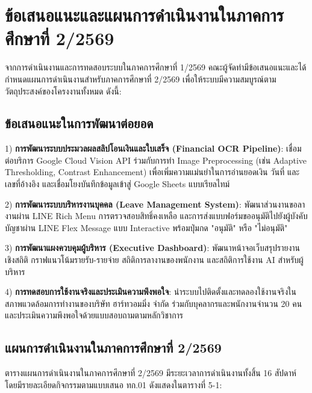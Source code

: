 \section{ข้อเสนอแนะและแผนการดำเนินงานในภาคการศึกษาที่ 2/2569}
\hspace*{1.3em}
จากการดำเนินงานและการทดสอบระบบในภาคการศึกษาที่ 1/2569 คณะผู้จัดทำมีข้อเสนอแนะและได้กำหนดแผนการดำเนินงานสำหรับภาคการศึกษาที่ 2/2569 เพื่อให้ระบบมีความสมบูรณ์ตามวัตถุประสงค์ของโครงงานทั้งหมด ดังนี้:

\subsection{ข้อเสนอแนะในการพัฒนาต่อยอด}
\begin{mycustomitem}
\item 1) \textbf{การพัฒนาระบบประมวลผลสลิปโอนเงินและใบเสร็จ (Financial OCR Pipeline)}: เชื่อมต่อบริการ Google Cloud Vision API ร่วมกับการทำ Image Preprocessing (เช่น Adaptive Thresholding, Contrast Enhancement) เพื่อเพิ่มความแม่นยำในการอ่านยอดเงิน วันที่ และเลขที่อ้างอิง และเชื่อมโยงบันทึกข้อมูลเข้าสู่ Google Sheets แบบเรียลไทม์
\end{mycustomitem}

\begin{mycustomitem}
\item 2) \textbf{การพัฒนาระบบบริหารงานบุคคล (Leave Management System)}: พัฒนาส่วนงานขอลางานผ่าน LINE Rich Menu การตรวจสอบสิทธิ์คงเหลือ และการส่งแบบฟอร์มขออนุมัติไปยังผู้บังคับบัญชาผ่าน LINE Flex Message แบบ Interactive พร้อมปุ่มกด "อนุมัติ" หรือ "ไม่อนุมัติ"
\end{mycustomitem}

\begin{mycustomitem}
\item 3) \textbf{การพัฒนาแผงควบคุมผู้บริหาร (Executive Dashboard)}: พัฒนาหน้าจอเว็บสรุปรายงานเชิงสถิติ กราฟแนวโน้มรายรับ-รายจ่าย สถิติการลางานของพนักงาน และสถิติการใช้งาน AI สำหรับผู้บริหาร
\end{mycustomitem}

\begin{mycustomitem}
\item 4) \textbf{การทดสอบการใช้งานจริงและประเมินความพึงพอใจ}: นำระบบไปติดตั้งและทดลองใช้งานจริงในสภาพแวดล้อมการทำงานของบริษัท ฮาร์ทวอมมิ่ง จำกัด ร่วมกับบุคลากรและพนักงานจำนวน 20 คน และประเมินความพึงพอใจด้วยแบบสอบถามตามหลักวิชาการ
\end{mycustomitem}

\subsection{แผนการดำเนินงานในภาคการศึกษาที่ 2/2569}
\hspace*{1.3em}
ตารางแผนการดำเนินงานในภาคการศึกษาที่ 2/2569 มีระยะเวลาการดำเนินงานทั้งสิ้น 16 สัปดาห์ โดยมีรายละเอียดกิจกรรมตามแบบเสนอ ทก.01 ดังแสดงในตารางที่ 5-1:

